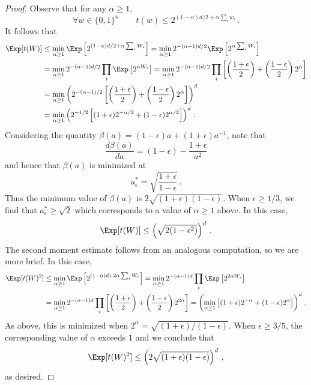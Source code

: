 \begin{proof}
  Observe that for any $\alpha \geq 1$,
  \[
    \forall w\in \{0,1\}^n \qquad t(w) \leq 2^{(1 - \alpha)d/2 + \alpha\sum_i w_i}\,.
  \]
  It follows that
  \begin{align*}
    \Exp[ t(W) ] &\leq \min_{\alpha \geq 1} \Exp\left[2^{(1 - \alpha)d/2 + \alpha\sum_i W_i}\right] = \min_{\alpha \geq 1} 2^{-(\alpha - 1)d/2} \Exp\left[2^{\alpha\sum_i W_i}\right]\\
                 &= \min_{\alpha \geq 1} 2^{-(\alpha - 1)d/2} \prod_i \Exp\left[2^{\alpha W_i}\right] = \min_{\alpha \geq 1} 2^{-(\alpha - 1)d/2} \prod_i \left[\left(\frac{1+\epsilon}{2}\right) + \left(\frac{1-\epsilon}{2}\right) 2^{\alpha}\right]\\
  &= \min_{\alpha \geq 1} \left(2^{-(\alpha - 1)/2} \left[\left(\frac{1+\epsilon}{2}\right) + \left(\frac{1-\epsilon}{2}\right) 2^{\alpha}\right]\right)^d \\
  &= \min_{\alpha \geq 1} \left(2^{-1/2} \left[(1+\epsilon)2^{-\alpha/2}  + (1-\epsilon) 2^{\alpha/2}\right]\right)^d\,.
\end{align*}
Considering the quantity
$\beta(a) = (1 - \epsilon) a + (1 + \epsilon) a^{-1}$, note that
\[
  \frac{d\beta(a)}{da} = (1 - \epsilon) - \frac{1 + \epsilon}{a^2}
\]
and hence that $\beta(a)$ is minimized at
\[
  a^*_\epsilon = \sqrt{\frac{1 + \epsilon}{1 - \epsilon}}\,.
\]
Thus the minimum value of $\beta(a)$ is
$2\sqrt{(1 + \epsilon)(1 - \epsilon)}$. When $\epsilon \geq 1/3$, we find that $a_\epsilon^* \geq \sqrt{2}$ which corresponds to a value of $\alpha \geq 1$ above. In this case, 
\[
  \Exp[t(W)] \leq \left( \sqrt{2(1 - \epsilon^2)}\right)^d\,.
\]
The second moment estimate follows from an analogous computation, so
we are more brief. In this case,
  \begin{align*}
    \Exp[ t(W)^2 ] &\leq \min_{\alpha \geq 1} \Exp\left[2^{(1 - \alpha)d + 2\alpha\sum_i W_i}\right] = \min_{\alpha \geq 1} 2^{-(\alpha - 1)d} \prod_i \Exp\left[2^{2\alpha W_i}\right]\\
    &= \min_{\alpha \geq 1} 2^{-(\alpha - 1)d} \prod_i \left[\left(\frac{1+\epsilon}{2}\right) + \left(\frac{1-\epsilon}{2}\right) 2^{2\alpha}\right] = \left(\min_{\alpha \geq 1} \left[(1+\epsilon)2^{-\alpha}  + (1-\epsilon) 2^{\alpha}\right]\right)^d\,.
\end{align*}
As above, this is minimized when $2^\alpha = \sqrt{(1 + \epsilon)/(1 - \epsilon)}$. When $\epsilon \geq 3/5$, the corresponding value of $\alpha$ exceeds $1$ and we conclude that
\[
  \Exp[t(W)^2] \leq \left(2\sqrt{(1 + \epsilon)(1 - \epsilon)}\right)^d\,,
\]
as desired.
\end{proof}

